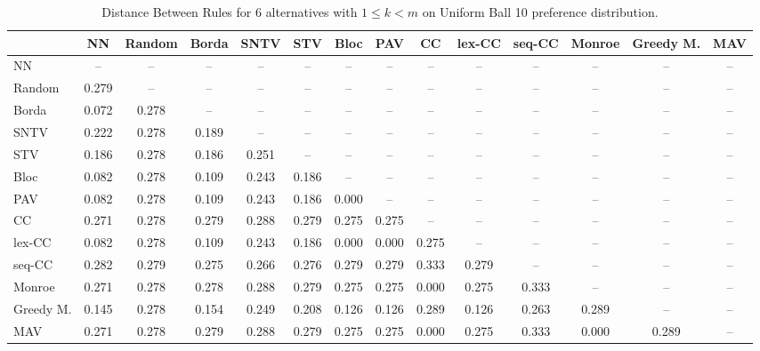 
\begin{table*}
\centering
\begin{tabular}{lccccccccccccc}
\toprule
 & NN & Random & Borda & SNTV & STV & Bloc & PAV & CC & lex-CC & seq-CC & Monroe & Greedy M. & MAV \\
\midrule
NN & -- & -- & -- & -- & -- & -- & -- & -- & -- & -- & -- & -- & -- \\
Random & 0.279 & -- & -- & -- & -- & -- & -- & -- & -- & -- & -- & -- & -- \\
Borda & 0.072 & 0.278 & -- & -- & -- & -- & -- & -- & -- & -- & -- & -- & -- \\
SNTV & 0.222 & 0.278 & 0.189 & -- & -- & -- & -- & -- & -- & -- & -- & -- & -- \\
STV & 0.186 & 0.278 & 0.186 & 0.251 & -- & -- & -- & -- & -- & -- & -- & -- & -- \\
Bloc & 0.082 & 0.278 & 0.109 & 0.243 & 0.186 & -- & -- & -- & -- & -- & -- & -- & -- \\
PAV & 0.082 & 0.278 & 0.109 & 0.243 & 0.186 & 0.000 & -- & -- & -- & -- & -- & -- & -- \\
CC & 0.271 & 0.278 & 0.279 & 0.288 & 0.279 & 0.275 & 0.275 & -- & -- & -- & -- & -- & -- \\
lex-CC & 0.082 & 0.278 & 0.109 & 0.243 & 0.186 & 0.000 & 0.000 & 0.275 & -- & -- & -- & -- & -- \\
seq-CC & 0.282 & 0.279 & 0.275 & 0.266 & 0.276 & 0.279 & 0.279 & 0.333 & 0.279 & -- & -- & -- & -- \\
Monroe & 0.271 & 0.278 & 0.278 & 0.288 & 0.279 & 0.275 & 0.275 & 0.000 & 0.275 & 0.333 & -- & -- & -- \\
Greedy M. & 0.145 & 0.278 & 0.154 & 0.249 & 0.208 & 0.126 & 0.126 & 0.289 & 0.126 & 0.263 & 0.289 & -- & -- \\
MAV & 0.271 & 0.278 & 0.279 & 0.288 & 0.279 & 0.275 & 0.275 & 0.000 & 0.275 & 0.333 & 0.000 & 0.289 & -- \\
\bottomrule
\end{tabular}

\caption{Distance Between Rules for 6 alternatives with $1 \leq k < m$ on Uniform Ball 10 preference distribution.}
\end{table*}
